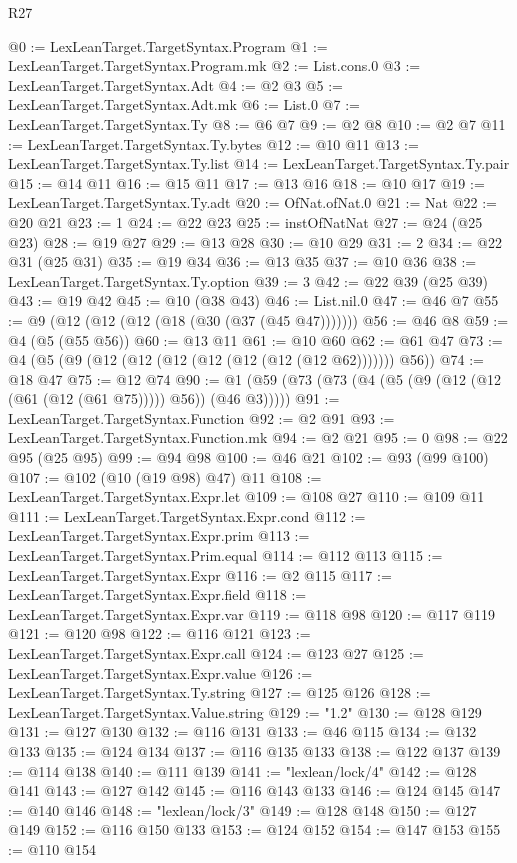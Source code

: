\begin{lexlean}{R27}
\begin{coremodule}
@0 := LexLeanTarget.TargetSyntax.Program
@1 := LexLeanTarget.TargetSyntax.Program.mk
@2 := List.cons.{0}
@3 := LexLeanTarget.TargetSyntax.Adt
@4 := @2 @3
@5 := LexLeanTarget.TargetSyntax.Adt.mk
@6 := List.{0}
@7 := LexLeanTarget.TargetSyntax.Ty
@8 := @6 @7
@9 := @2 @8
@10 := @2 @7
@11 := LexLeanTarget.TargetSyntax.Ty.bytes
@12 := @10 @11
@13 := LexLeanTarget.TargetSyntax.Ty.list
@14 := LexLeanTarget.TargetSyntax.Ty.pair
@15 := @14 @11
@16 := @15 @11
@17 := @13 @16
@18 := @10 @17
@19 := LexLeanTarget.TargetSyntax.Ty.adt
@20 := OfNat.ofNat.{0}
@21 := Nat
@22 := @20 @21
@23 := 1
@24 := @22 @23
@25 := instOfNatNat
@27 := @24 (@25 @23)
@28 := @19 @27
@29 := @13 @28
@30 := @10 @29
@31 := 2
@34 := @22 @31 (@25 @31)
@35 := @19 @34
@36 := @13 @35
@37 := @10 @36
@38 := LexLeanTarget.TargetSyntax.Ty.option
@39 := 3
@42 := @22 @39 (@25 @39)
@43 := @19 @42
@45 := @10 (@38 @43)
@46 := List.nil.{0}
@47 := @46 @7
@55 := @9 (@12 (@12 (@12 (@18 (@30 (@37 (@45 @47)))))))
@56 := @46 @8
@59 := @4 (@5 (@55 @56))
@60 := @13 @11
@61 := @10 @60
@62 := @61 @47
@73 := @4 (@5 (@9 (@12 (@12 (@12 (@12 (@12 (@12 (@12 @62))))))) @56))
@74 := @18 @47
@75 := @12 @74
@90 := @1 (@59 (@73 (@73 (@4 (@5 (@9 (@12 (@12 (@61 (@12 (@61 @75))))) @56)) (@46 @3)))))
@91 := LexLeanTarget.TargetSyntax.Function
@92 := @2 @91
@93 := LexLeanTarget.TargetSyntax.Function.mk
@94 := @2 @21
@95 := 0
@98 := @22 @95 (@25 @95)
@99 := @94 @98
@100 := @46 @21
@102 := @93 (@99 @100)
@107 := @102 (@10 (@19 @98) @47) @11
@108 := LexLeanTarget.TargetSyntax.Expr.let
@109 := @108 @27
@110 := @109 @11
@111 := LexLeanTarget.TargetSyntax.Expr.cond
@112 := LexLeanTarget.TargetSyntax.Expr.prim
@113 := LexLeanTarget.TargetSyntax.Prim.equal
@114 := @112 @113
@115 := LexLeanTarget.TargetSyntax.Expr
@116 := @2 @115
@117 := LexLeanTarget.TargetSyntax.Expr.field
@118 := LexLeanTarget.TargetSyntax.Expr.var
@119 := @118 @98
@120 := @117 @119
@121 := @120 @98
@122 := @116 @121
@123 := LexLeanTarget.TargetSyntax.Expr.call
@124 := @123 @27
@125 := LexLeanTarget.TargetSyntax.Expr.value
@126 := LexLeanTarget.TargetSyntax.Ty.string
@127 := @125 @126
@128 := LexLeanTarget.TargetSyntax.Value.string
@129 := "1.2"
@130 := @128 @129
@131 := @127 @130
@132 := @116 @131
@133 := @46 @115
@134 := @132 @133
@135 := @124 @134
@137 := @116 @135 @133
@138 := @122 @137
@139 := @114 @138
@140 := @111 @139
@141 := "lexlean/lock/4"
@142 := @128 @141
@143 := @127 @142
@145 := @116 @143 @133
@146 := @124 @145
@147 := @140 @146
@148 := "lexlean/lock/3"
@149 := @128 @148
@150 := @127 @149
@152 := @116 @150 @133
@153 := @124 @152
@154 := @147 @153
@155 := @110 @154

\end{coremodule}
\end{lexlean}

